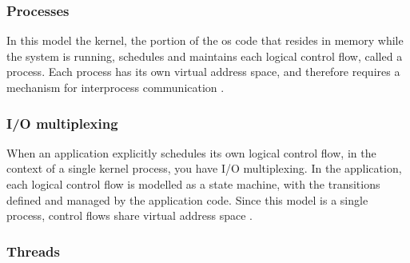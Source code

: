 \subsubsection{Processes}
In this model the kernel, the portion of the \gls{os} code that resides in memory while the system is running, schedules and maintains each logical control flow, called a process. Each process has its own virtual address space, and therefore requires a mechanism for interprocess communication \cite{Bryant2016}.

\subsubsection{I/O multiplexing}
When an application explicitly schedules its own logical control flow, in the context of a single kernel process, you have I/O multiplexing. In the application, each logical control flow is modelled as a state machine, with the transitions defined and managed by the application code. Since this model is a single process, control flows share virtual address space \cite{Bryant2016}.

\subsubsection{Threads}
